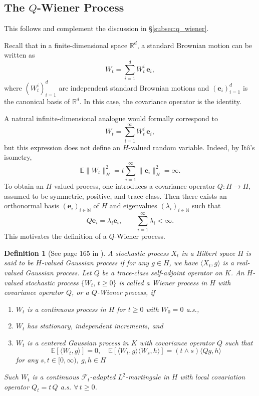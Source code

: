 \documentclass[12pt]{amsart}
\numberwithin{equation}{section}
\newtheorem{definition}[theorem]{Definition}
\begin{document}
\subsection{The $Q$-Wiener Process}\label{app:noise}

This follows and complement the discussion in \S\ref{subsec:q_wiener}. 


Recall that in a finite-dimensional space $\mathbb{R}^d$, a standard Brownian motion can be written as
\[
    W_t = \sum_{i=1}^{d} W_t^{i}\,\mathbf{e}_i,
\]
where $(W_t^{i})_{i=1}^d$ are independent standard Brownian motions and $(\mathbf{e}_i)_{i=1}^d$ is the canonical basis of $\mathbb{R}^d$. In this case, the covariance operator is the identity.

A natural infinite-dimensional analogue would formally correspond to
\[
    W_t = \sum_{i=1}^{\infty} W_t^{i}\,\mathbf{e}_i,
\]
but this expression does not define an $H$-valued random variable. Indeed, by It\^o's isometry,
\[
    \mathbb{E}\|W_t\|_H^2 = t \sum_{i=1}^{\infty} \|\mathbf{e}_i\|_H^2 = \infty.
\]
To obtain an $H$-valued process, one introduces a covariance operator $Q:H\to H$, assumed to be symmetric, positive, and trace-class. Then there exists an orthonormal basis $(\mathbf{e}_i)_{i\in\mathbb{N}}$ of $H$ and eigenvalues $(\lambda_i)_{i\in\mathbb{N}}$ such that
\[
    Q\mathbf{e}_i = \lambda_i \mathbf{e}_i, \qquad \sum_{i=1}^\infty \lambda_i < \infty.
\]
This motivates the definition of a $Q$-Wiener process. 


\begin{definition}[See page 165 in \cite{chow2007stochastic}]
A stochastic process $X_t$ in a Hilbert space $H$ is said to be \textit{$H$-valued Gaussian process} if for any $g\in H$, we have $\langle X_t, g\rangle$ is a real-valued Gaussian process. Let $Q$ be a trace-class self-adjoint operator on $K$. 
An $H$-valued stochastic process $\{W_t,\,t\geq 0\}$ is called a Wiener process in $H$ with covariance operator $Q$, or a $Q$-Wiener process, if
\begin{enumerate}
    \item $W_t$ is a continuous process in $H$ for $t\geq 0$ with $W_0 = 0$ a.s.,
    \item $W_t$ has stationary, independent increments, and
    \item $W_t$ is a centered Gaussian process in $K$ with covariance operator $Q$ such that 
    \[
    \mathbb{E}[\langle W_t, g \rangle] = 0, \quad \mathbb{E}[\langle W_t,g \rangle \langle W_s, h \rangle] = (t\wedge s) \langle Qg,h \rangle
    \]
    for any $s,t\in [0,\infty)$, $g,h\in H$
\end{enumerate}
Such $W_t$ is a continuous $\mathscr{F}_t$-adapted $L^2$-martingale in $H$ with local covariation operator $Q_t = t\,Q$ a.s. $\forall\, t\geq 0$. 
\end{definition}
\end{document}
